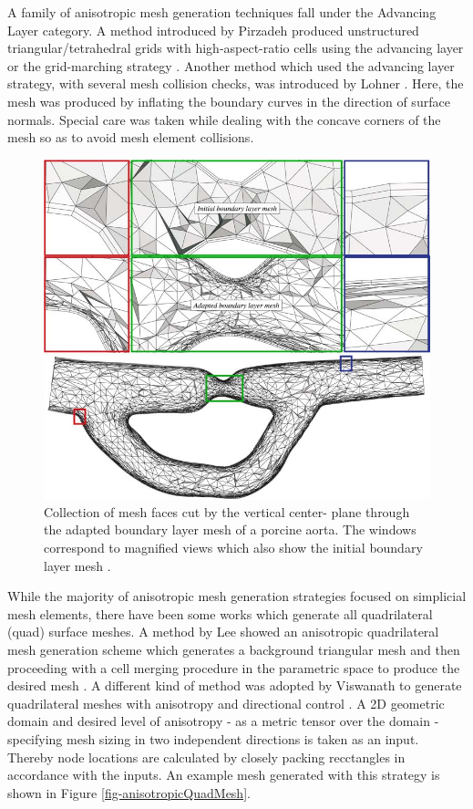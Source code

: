 A family of anisotropic mesh generation techniques fall under the Advancing Layer category. A method introduced by Pirzadeh produced unstructured triangular/tetrahedral grids with high-aspect-ratio cells using the advancing layer or the grid-marching strategy \cite{pirzadeh1994unstructured}. Another method which used the advancing layer strategy, with several mesh collision checks, was introduced by Lohner \cite{lohner1993matching}. Here, the mesh was produced by inflating the boundary curves in the direction of surface normals. Special care was taken while dealing with the concave corners of the mesh so as to avoid mesh element collisions.

\begin{figure}
	\centering
	\includegraphics[width=0.8\linewidth]{img/intro/lit/sahni.png}
	\caption{ Collection of mesh faces cut by the vertical center- plane through the adapted boundary layer mesh of a porcine aorta. The windows correspond to magnified views which also show the initial boundary layer mesh \cite{sahni2008adaptive}.}
	\label{fig-sahni}
\end{figure}


While the majority of anisotropic mesh generation strategies focused on simplicial mesh elements, there have been some works which generate all quadrilateral (quad) surface meshes. A method by Lee \etal showed an anisotropic quadrilateral mesh generation scheme which generates a background triangular mesh and then proceeding with a cell merging procedure in the parametric space to produce the desired mesh \cite{lee2003new}. A different kind of method was adopted by Viswanath \etal to generate quadrilateral meshes with anisotropy and directional control \cite{viswanath2000quadrilateral}. A 2D geometric domain and desired level of anisotropy - as a metric tensor over the domain - specifying mesh sizing in two independent directions is taken as an input. Thereby node locations are calculated by closely packing recctangles in accordance with the inputs. An example mesh generated with this strategy is shown in Figure \ref{fig-anisotropicQuadMesh}.

